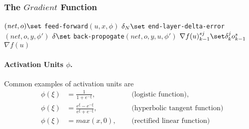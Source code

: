 \subsubsection{The $\mathit{Gradient}$ Function}
\begin{algorithm} \label{alg:mlp-gradient}
\begin{algorithmic}[1]
    \State $(\mathit{net}, o) \set$ \texttt{feed-forward}$(u, x, \phi)$
    \State $\delta_N \set$ \texttt{end-layer-delta-error}$(\mathit{net}, o, y, \phi')$
    \State $\delta \set$ \texttt{back-propogate}$(\mathit{net}, o, y, u, \phi')$
                \State $\nabla f(u)_{k-1}^{sj} \set \delta_k^j o_{k-1}^s$
            \EndFor
        \EndFor
    \EndFor
    \State \Return $\nabla f(u)$
\end{algorithmic}
\end{algorithm}

\paragraph{Activation Units $\phi$.}
Common examples of activation units are
\[\begin{alignedat}{3}
\phi(\xi) &= \frac{1}{1 + e^{-\xi}}, &\quad \text{ (logistic function),}\\
\phi(\xi) &= \frac{e^{\xi} - e^{-\xi}}{e^{\xi} + e^{-\xi}}, &\quad \text{ (hyperbolic tangent function)}\\
\phi(\xi) &= max(x,0), &\quad \text{ (rectified linear function)}\\
\end{alignedat}\]

